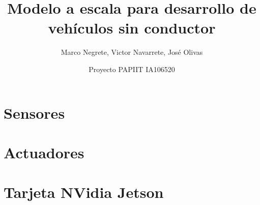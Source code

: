 \documentclass[letterpaper, 12pt]{article}
\title{Modelo a escala para desarrollo de vehículos sin conductor}
\author{Marco Negrete, Victor Navarrete, José Olivas}
\date{Proyecto PAPIIT IA106520}
\begin{document}
\maketitle

\section{Sensores}
\section{Actuadores}
\section{Tarjeta NVidia Jetson}
\end{document}
